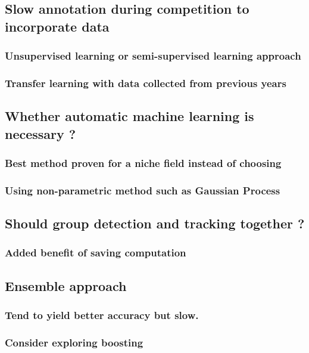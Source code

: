 \documentclass[11pt]{article}
\begin{document}
\subsection{Slow annotation during competition to incorporate data}
\label{sec:orgbb26ff0}
\subsubsection{Unsupervised learning or semi-supervised learning approach}
\label{sec:orgbb066b9}
\subsubsection{Transfer learning with data collected from previous years}
\label{sec:orga20dead}
\subsection{Whether automatic machine learning is necessary ?}
\label{sec:orgac65793}
\subsubsection{Best method proven for a niche field instead of choosing}
\label{sec:org58efc64}
\subsubsection{Using non-parametric method such as Gaussian Process}
\label{sec:org910a1b1}
\subsection{Should group detection and tracking together ?}
\label{sec:org7ad0ea9}
\subsubsection{Added benefit of saving computation}
\label{sec:org664879f}
\subsection{Ensemble approach}
\label{sec:orgac22fd3}
\subsubsection{Tend to yield better accuracy but slow.}
\label{sec:org396389a}
\subsubsection{Consider exploring boosting}
\label{sec:org6eb2762}
\end{document}
